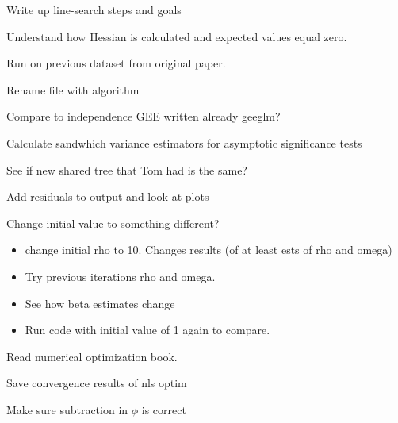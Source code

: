 \documentclass[10pt]{article}
\theoremstyle{definition}
\begin{document}
\begin{todolist}
  \item Write up line-search steps and goals
  \item Understand how Hessian is calculated and expected values equal zero.
  \item Run on previous dataset from original paper.
  \item Rename file with algorithm
  \item Compare to independence GEE written already geeglm?
  \item Calculate sandwhich variance estimators for asymptotic significance tests
  \item See if new shared tree that Tom had is the same?
  \item Add residuals to output and look at plots
  \item Change initial value to something different?
  \begin{itemize}
    \item change initial rho to 10. Changes results (of at least ests of rho and omega)
    \item Try previous iterations rho and omega.
    \item See how beta estimates change
    \item Run code with initial value of 1 again to compare.
  \end{itemize}
  \item Read numerical optimization book.

  \item Save convergence results of nls optim
    \item Make sure subtraction in $\phi$ is correct
\end{todolist}


\newpage
\end{document}
